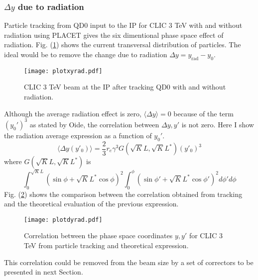 \subsubsection{$\Delta y$ due to radiation}
Particle tracking from QD0 input to the IP for CLIC 3 TeV with and without radiation using PLACET \cite{Placet} gives the six dimentional phase space effect of radiation. Fig. (\ref{f:CLIC3TeVbeamsizeIP}) shows the current transversal distribution of particles. The ideal would be to remove the change due to radiation $\Delta y = y_\text{rad} -y_0$.\par
\begin{figure}[!htb]
\centering
 \texttt{[image: plotxyrad.pdf]}\caption{CLIC 3 TeV beam at the IP after tracking QD0 with and without radiation.}\label{f:CLIC3TeVbeamsizeIP}
\end{figure}
Although the average radiation effect is zero, $\langle \Delta y \rangle = 0$ because of the term $(y_0')^3$ as stated by Oide, the correlation between $\Delta y, y'$ is not zero. Here I show the radiation average expression as a function of $y_0'$.
\begin{equation}
 \langle\Delta y (y'_0)\rangle = \frac{2}{3}r_e\gamma^3G(\sqrt{K}L,\sqrt{K}L^*)(y'_0)^3
\end{equation}
where $G(\sqrt{K}L,\sqrt{K}L^*)$ is
\begin{equation}
\int_0^{\sqrt{K}L}(\sin\phi+\sqrt{K}L^*\cos\phi)^2\int_0^\phi (\sin\phi'+\sqrt{K}L^*\cos\phi')^2 d\phi'd\phi
\end{equation}
Fig. (\ref{f:correlation}) shows the comparison between the correlation obtained from tracking and the theoretical evaluation of the previous expression.\par
\begin{figure}[!htb]
\centering
\texttt{[image: plotdyrad.pdf]}\caption{Correlation between the phase space coordinates $y,y'$ for CLIC 3 TeV from particle tracking and theoretical expression.}\label{f:correlation}
\end{figure}
This correlation could be removed from the beam size by a set of correctors to be presented in next Section.
